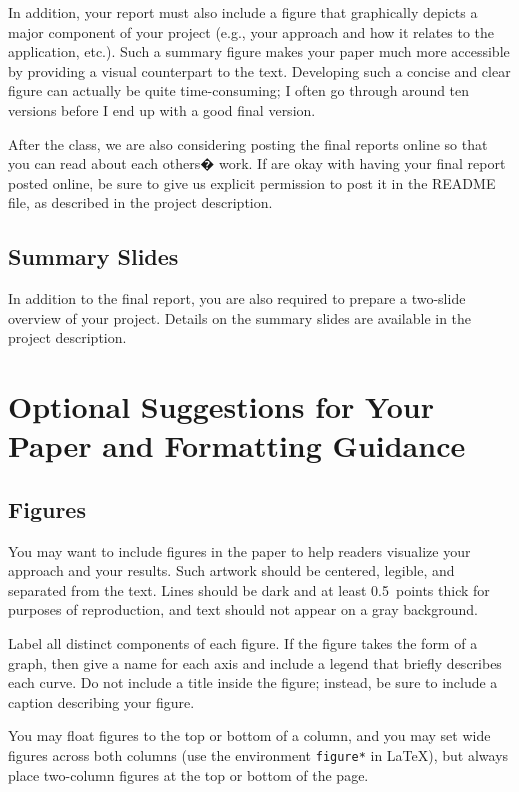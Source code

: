 \documentclass{article}
\begin{document}
In addition, your report must also include a figure that graphically depicts a major component of your project (e.g., your approach and how it relates to the application, etc.).  Such a summary figure makes your paper much more accessible by providing a visual counterpart to the text.  Developing such a concise and clear figure can actually be quite time-consuming; I often go through around ten versions before I end up with a good final version.

After the class, we are also considering posting the final reports online so that you can read about each others� work. If are okay with having your final report posted online, be sure to give us explicit permission to post it in the README file, as described in the project description.

\subsection{Summary Slides}

In addition to the final report, you are also required to prepare a two-slide overview of your project.  Details on the summary slides are available in the project description.

\section{Optional Suggestions for Your Paper and Formatting Guidance} 

\subsection{Figures}
 
You may want to include figures in the paper to help readers visualize
your approach and your results. Such artwork should be centered,
legible, and separated from the text. Lines should be dark and at
least 0.5~points thick for purposes of reproduction, and text should
not appear on a gray background.

Label all distinct components of each figure. If the figure takes the
form of a graph, then give a name for each axis and include a legend
that briefly describes each curve. Do not include a title inside the
figure; instead, be sure to include a caption describing your figure.

You may float figures to the top or
bottom of a column, and you may set wide figures across both columns
(use the environment {\tt figure*} in \LaTeX), but always place
two-column figures at the top or bottom of the page.
\end{document}
